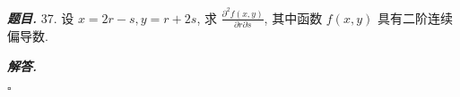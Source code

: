 \documentclass[10pt, a4paper, oneside]{ctexart}
\newenvironment{problem}{\begin{framed}\par\noindent\textbf{\textit{题目. }}}{\end{framed}\par}
\newenvironment{solution}{%
  \par\noindent\textbf{\textit{解答. }}\ignorespaces
}{%
  \hfill\ensuremath{\square}\par %
}
\begin{document}
    \begin{problem}
        37. 设 $x=2 r-s, y=r+2 s$, 求 $\frac{\partial^2 f(x, y)}{\partial r \partial s}$, 其中函数 $f(x, y)$ 具有二阶连续偏导数.
    \end{problem}
    \begin{solution}
        
    \end{solution}
\end{document}
